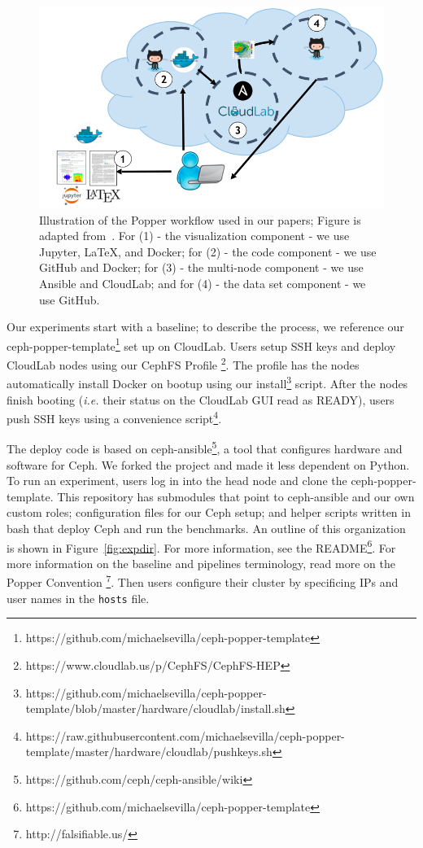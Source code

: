 \begin{figure}[tb] 
  \centering
  \includegraphics[width=1\linewidth]{./figures/workflow.png}
  \caption{Illustration of the Popper workflow used in our papers; Figure is
adapted from~\cite{jimenez:ipdpsw17-popper}. For (1) - the visualization
component - we use Jupyter, \LaTeX, and Docker; for (2) - the code component -
we use GitHub and Docker; for (3) - the multi-node component - we use Ansible
and CloudLab; and for (4) - the data set component - we use GitHub.}
  \label{fig:workflow}
\end{figure}

Our experiments start with a baseline; to describe the process, we reference
our
ceph-popper-template\footnote{https://github.com/michaelsevilla/ceph-popper-template}
set up on CloudLab. Users setup SSH keys and deploy CloudLab nodes using our
CephFS Profile \footnote{https://www.cloudlab.us/p/CephFS/CephFS-HEP}.  The
profile has the nodes automatically install Docker on bootup using our
install\footnote{https://github.com/michaelsevilla/ceph-popper-template/blob/master/hardware/cloudlab/install.sh}
script. After the nodes finish booting ({\it i.e.}  their status on the
CloudLab GUI read as READY), users push SSH keys using a convenience
script\footnote{https://raw.githubusercontent.com/michaelsevilla/ceph-popper-template/master/hardware/cloudlab/pushkeys.sh}.

The deploy code is based on
ceph-ansible\footnote{https://github.com/ceph/ceph-ansible/wiki}, a tool that
configures hardware and software for Ceph. We forked the project and made it
less dependent on Python. To run an experiment, users log in into the head node
and clone the ceph-popper-template. This repository has submodules that point
to ceph-ansible and our own custom roles; configuration files for our Ceph
setup; and helper scripts written in bash that deploy Ceph and run the
benchmarks. An outline of this organization is shown in
Figure~\ref{fig:expdir}.  For more information, see the
README\footnote{https://github.com/michaelsevilla/ceph-popper-template}. For
more information on the baseline and pipelines terminology, read more on the
Popper Convention \footnote{http://falsifiable.us/}. Then users configure their
cluster by specificing IPs and user names in the \texttt{hosts} file. 

